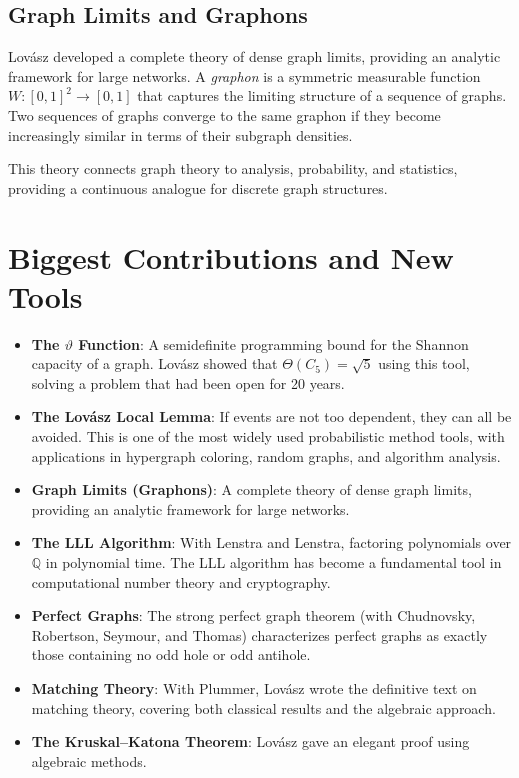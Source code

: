 \subsection{Graph Limits and Graphons}

Lov\'asz developed a complete theory of dense graph limits, providing an analytic framework for large networks. A \emph{graphon} is a symmetric measurable function $W: [0,1]^2 \to [0,1]$ that captures the limiting structure of a sequence of graphs. Two sequences of graphs converge to the same graphon if they become increasingly similar in terms of their subgraph densities.

This theory connects graph theory to analysis, probability, and statistics, providing a continuous analogue for discrete graph structures.

\section{Biggest Contributions and New Tools}

\begin{itemize}
\item \textbf{The $\vartheta$ Function}: A semidefinite programming bound for the Shannon capacity of a graph. Lov\'asz showed that $\Theta(C_5) = \sqrt{5}$ using this tool, solving a problem that had been open for 20 years.
\item \textbf{The Lov\'asz Local Lemma}: If events are not too dependent, they can all be avoided. This is one of the most widely used probabilistic method tools, with applications in hypergraph coloring, random graphs, and algorithm analysis.
\item \textbf{Graph Limits (Graphons)}: A complete theory of dense graph limits, providing an analytic framework for large networks.
\item \textbf{The LLL Algorithm}: With Lenstra and Lenstra, factoring polynomials over $\mathbb{Q}$ in polynomial time. The LLL algorithm has become a fundamental tool in computational number theory and cryptography.
\item \textbf{Perfect Graphs}: The strong perfect graph theorem (with Chudnovsky, Robertson, Seymour, and Thomas) characterizes perfect graphs as exactly those containing no odd hole or odd antihole.
\item \textbf{Matching Theory}: With Plummer, Lov\'asz wrote the definitive text on matching theory, covering both classical results and the algebraic approach.
\item \textbf{The Kruskal--Katona Theorem}: Lov\'asz gave an elegant proof using algebraic methods.
\end{itemize}

